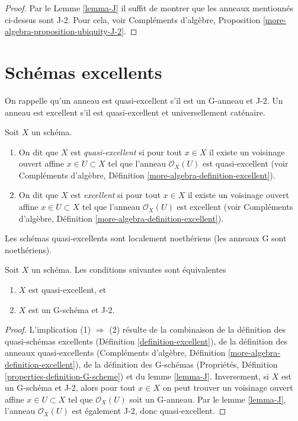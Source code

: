 \begin{proof}
Par le Lemme \ref{lemma-J} il suffit de montrer que
les anneaux mentionnés ci-dessus sont J-2. Pour
cela, voir Compléments d'algèbre, Proposition \ref{more-algebra-proposition-ubiquity-J-2}.
\end{proof}




\section{Schémas excellents}
\label{section-excellent}

\noindent
On rappelle qu'un anneau est quasi-excellent s'il est un G-anneau et J-2.
Un anneau est excellent s'il est quasi-excellent et universellement caténaire.

\begin{definition}
\label{definition-excellent}
Soit $X$ un schéma.
\begin{enumerate}
\item On dit que $X$ est {\it quasi-excellent}
si pour tout $x \in X$ il existe un voisinage ouvert affine $x \in U \subset X$
tel que l'anneau $\mathcal{O}_X(U)$ est quasi-excellent
(voir Compléments d'algèbre, Définition \ref{more-algebra-definition-excellent}).
\item On dit que $X$ est {\it excellent} si
pour tout $x \in X$ il existe un voisinage ouvert affine $x \in U \subset X$
tel que l'anneau $\mathcal{O}_X(U)$ est
excellent (voir Compléments d'algèbre, Définition \ref{more-algebra-definition-excellent}).
\end{enumerate}
\end{definition}

\noindent
Les schémas quasi-excellents sont localement noethériens (les anneaux G sont noethériens).

\begin{lemma}
\label{lemma-characterize-quasi-excellent}
Soit $X$ un schéma. Les conditions suivantes sont équivalentes
\begin{enumerate}
\item $X$ est quasi-excellent, et
\item $X$ est un G-schéma et J-2.
\end{enumerate}
\end{lemma}

\begin{proof}
L'implication (1) $\Rightarrow$ (2) résulte de la combinaison
de la définition des quasi-schémas
excellents (Définition \ref{definition-excellent}),
de la définition des anneaux quasi-excellents
(Compléments d'algèbre, Définition \ref{more-algebra-definition-excellent}), de
la définition des G-schémas
(Propriétés, Définition \ref{properties-definition-G-scheme}) et du lemme \ref{lemma-J}.
Inversement, si
$X$ est un G-schéma et J-2, alors pour tout $x \in X$
on peut trouver un voisinage ouvert affine $x \in U \subset X$
tel que $\mathcal{O}_X(U)$ soit un G-anneau. Par le lemme \ref{lemma-J},
l'anneau $\mathcal{O}_X(U)$ est également J-2, donc quasi-excellent.
\end{proof}

